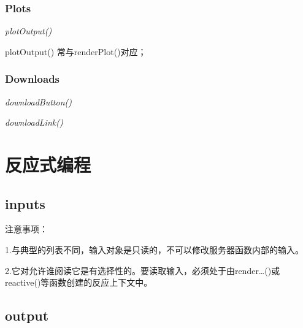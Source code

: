 \documentclass[
]{book}
\newenvironment{Shaded}{\begin{snugshade}}{\end{snugshade}}
\newcommand{\AttributeTok}[1]{\textcolor[rgb]{0.77,0.63,0.00}{#1}}
\newcommand{\ControlFlowTok}[1]{\textcolor[rgb]{0.13,0.29,0.53}{\textbf{#1}}}
\newcommand{\DecValTok}[1]{\textcolor[rgb]{0.00,0.00,0.81}{#1}}
\newcommand{\FunctionTok}[1]{\textcolor[rgb]{0.00,0.00,0.00}{#1}}
\newcommand{\NormalTok}[1]{#1}
\newcommand{\OtherTok}[1]{\textcolor[rgb]{0.56,0.35,0.01}{#1}}
\newcommand{\SpecialCharTok}[1]{\textcolor[rgb]{0.00,0.00,0.00}{#1}}
\newcommand{\StringTok}[1]{\textcolor[rgb]{0.31,0.60,0.02}{#1}}
\begin{document}
\hypertarget{plots}{%
\subsubsection{Plots}\label{plots}}

\emph{plotOutput()}

plotOutput() 常与renderPlot()对应；

\begin{Shaded}
\end{Shaded}

\hypertarget{downloads}{%
\subsubsection{Downloads}\label{downloads}}

\emph{downloadButton()}

\emph{downloadLink()}

\hypertarget{ux53cdux5e94ux5f0fux7f16ux7a0b}{%
\section{反应式编程}\label{ux53cdux5e94ux5f0fux7f16ux7a0b}}

\hypertarget{inputs-1}{%
\subsection{inputs}\label{inputs-1}}

注意事项：

1.与典型的列表不同，输入对象是只读的，不可以修改服务器函数内部的输入。

2.它对允许谁阅读它是有选择性的。要读取输入，必须处于由render\ldots()或reactive()等函数创建的反应上下文中。

\hypertarget{output}{%
\subsection{output}\label{output}}
\end{document}
